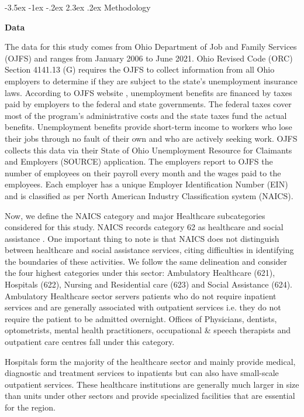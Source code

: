 \documentclass[11pt]{article}
\makeatletter
\renewcommand\section{\@startsection {section}{1}{\z@}%
                                       {-3.5ex \@plus -1ex \@minus -.2ex}%
                                       {2.3ex \@plus.2ex}%
                                       {\normalfont\fontfamily{phv}\fontsize{16}{19}\bfseries}}
\makeatother
\begin{document}
\section{Methodology} \label{s:methods}

{\bf Data}

\noindent
The data for this study comes from Ohio Department of Job and Family Services (OJFS) and ranges from January 2006 to June 2021. Ohio Revised Code (ORC) Section 4141.13 (G) requires the OJFS to collect information from all Ohio employers to determine if they are subject to the state’s unemployment insurance laws. According to OJFS website \cite{ui}, unemployment benefits are financed by taxes paid by employers to the federal and state governments. The federal taxes cover most of the program’s administrative costs and the state taxes fund the actual benefits. Unemployment benefits provide short-term income to workers who lose their jobs through no fault of their own and who are actively seeking work. OJFS collects this data via their State of Ohio Unemployment Resource for Claimants and Employers (SOURCE) application. The employers report to OJFS the number of employees on their payroll every month and the wages paid to the employees. Each employer has a unique Employer Identification Number (EIN) and is classified as per North American Industry Classification system (NAICS). 

Now, we define the NAICS category and major Healthcare subcategories considered for this study. NAICS records category 62 as healthcare and social assistance \cite{naicspdf}. One important thing to note is that NAICS does not distinguish between healthcare and social assistance services, citing difficulties in identifying the boundaries of these activities. We follow the same delineation and consider the four highest categories under this sector: Ambulatory Healthcare (621), Hospitals (622), Nursing and Residential care (623) and Social Assistance (624).  
\\

Ambulatory Healthcare sector servers patients who do not require inpatient services and are generally associated with outpatient services i.e. they do not require the patient to be admitted overnight. Offices of Physicians, dentists, optometrists, mental health practitioners, occupational \& speech therapists and outpatient care centres fall under this category.

Hospitals form the majority of the healthcare sector and mainly provide medical, diagnostic and treatment services to inpatients but can also have small-scale outpatient services. These healthcare institutions are generally much larger in size than units under other sectors and provide specialized facilities that are essential for the region.
\end{document}
